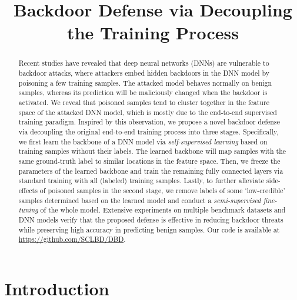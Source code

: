 \title{Backdoor Defense via Decoupling the Training Process}



\maketitle

\begin{abstract}
Recent studies have revealed that deep neural networks (DNNs) are vulnerable to backdoor attacks, where attackers embed hidden backdoors in the DNN model by poisoning a few training samples. The attacked model behaves normally on benign samples, whereas its prediction will be maliciously changed when the backdoor is activated. We reveal that poisoned samples tend to cluster together in the feature space of the attacked DNN model, which is mostly due to the end-to-end supervised training paradigm. Inspired by this observation, we propose a novel backdoor defense via decoupling the original end-to-end training process into three stages. Specifically, we first learn the backbone of a DNN model via \emph{self-supervised learning} based on training samples without their labels. The learned backbone will map samples with the same ground-truth label to similar locations in the feature space. Then, we freeze the parameters of the learned backbone and train the remaining fully connected layers via standard training with all (labeled) training samples. Lastly, to further alleviate side-effects of poisoned samples in the second stage, we remove labels of some `low-credible' samples determined based on the learned model and conduct a \emph{semi-supervised fine-tuning} of the whole model. Extensive experiments on multiple benchmark datasets and DNN models verify that the proposed defense is effective in reducing backdoor threats while preserving high accuracy in predicting benign samples. Our code is available at \url{https://github.com/SCLBD/DBD}.
\end{abstract}

\section{Introduction}
\label{sec:intro}


